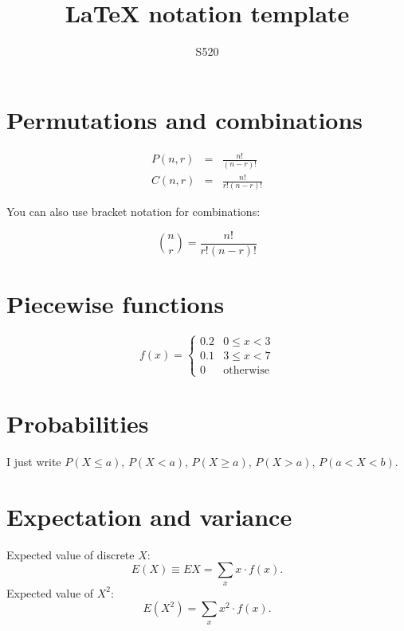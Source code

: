 \documentclass[11pt]{article}
\title{LaTeX notation template}
\author{S520}
\date{}
\begin{document}
\maketitle

\section*{Permutations and combinations}

\begin{eqnarray*}
P(n, r) &=& \frac{n!}{(n - r)!} \\
C(n, r) &=& \frac{n!}{r! (n - r)!}
\end{eqnarray*}

You can also use bracket notation for combinations:

\[
{{n}\choose{r}} = \frac{n!}{r! (n - r)!}
\]

\section*{Piecewise functions}

\[
f(x) = \left\{
\begin{array}{cl}
0.2 & 0 \le x < 3 \\
0.1 & 3 \le x < 7 \\
0 & \textrm{otherwise}
\end{array}
\right.
\]

\section*{Probabilities}

I just write $P(X \le a)$, $P(X < a)$, $P(X \ge a)$, $P(X > a)$, $P(a < X < b)$.

\section*{Expectation and variance}

Expected value of discrete $X$:
\[
E(X) \equiv EX = \sum_x x \cdot f(x).
\]
Expected value of $X^2$:
\[
E(X^2) = \sum_x x^2 \cdot f(x).
\]
\end{document}
